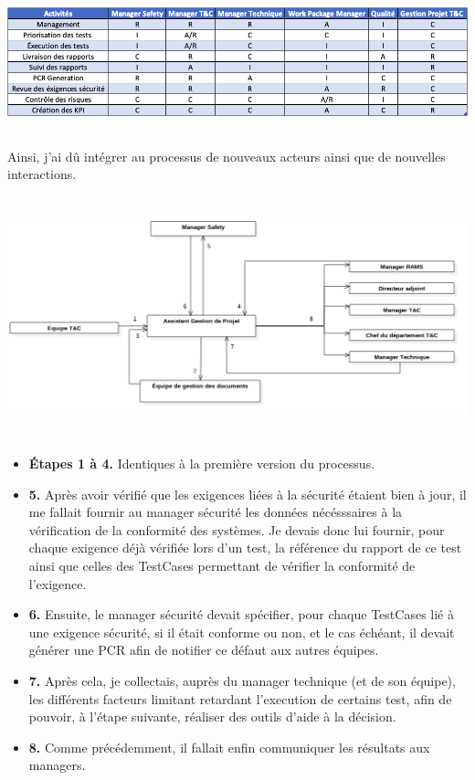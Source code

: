 \begin{center}
\includegraphics[height=4cm]{ressources/images/figures/RACI.png}
\end{center}

Ainsi, j'ai dû intégrer au processus de nouveaux acteurs ainsi que de nouvelles interactions. 

\begin{center}
\includegraphics[height=7cm]{ressources/images/figures/Workflow2.png}
\end{center}


\begin{itemize}
\item \textbf{Étapes 1 à 4.} Identiques à la première version du processus.
\item \textbf{5.} Après avoir vérifié que les exigences liées à la sécurité étaient bien à jour, il me fallait fournir au manager sécurité les données nécésssaires à la vérification de la conformité des systèmes. Je devais donc lui fournir, pour chaque exigence déjà vérifiée lors d'un test, la référence du rapport de ce test ainsi que celles des \gls{TestCases} permettant de vérifier la conformité de l'exigence.
\item \textbf{6.} Ensuite, le manager sécurité devait spécifier, pour chaque \gls{TestCases} lié à une exigence sécurité, si il était conforme ou non, et le cas échéant, il devait générer une \gls{PCR} afin de notifier ce défaut aux autres équipes.
\item \textbf{7.} Après cela, je collectais, auprès du manager technique (et de son équipe), les différents facteurs limitant retardant l'execution de certains test, afin de pouvoir, à l'étape suivante, réaliser des outils d'aide à la décision.
\item \textbf{8.} Comme précédemment, il fallait enfin communiquer les résultats aux managers.
\end{itemize}


